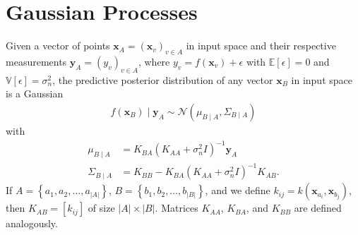 \documentclass{article}
\def\*#1{\bm{#1}}
\begin{document}
 


\begin{abstract}\end{abstract} 

\section{Gaussian Processes}
Given a vector of points $\*x_A = \left(\*x_v\right)_{v\in A}$ in input space
and their respective measurements
$\*y_A = \left(y_v\right)_{v\in A}$, where $y_v = f(\*x_v) + \epsilon$
with $\mathbb{E}[\epsilon] = 0$ and $\mathbb{V}[\epsilon] = \sigma_n^2$,
the predictive posterior distribution of any vector $\*x_B$ in input
space is a Gaussian
\begin{align*}
f(\*x_B)\mid \*y_A \sim \mathcal{N}\left(\mu_{B\mid A}, \Sigma_{B\mid A}\right)
\end{align*}
with
\begin{align*}
\mu_{B\mid A} &= K_{BA}\left(K_{AA} + \sigma_n^2 I\right)^{-1}\*y_A\\
\Sigma_{B\mid A} &= K_{BB} - K_{BA}\left(K_{AA} + \sigma_n^2 I\right)^{-1}K_{AB}.
\end{align*}
If $A = \left\{a_1, a_2, \ldots, a_{|A|}\right\}$, $B = \left\{b_1, b_2, \ldots, b_{|B|}\right\}$,
and we define $k_{ij} = k(\*x_{a_i}, \*x_{b_j})$,
then $K_{AB} = \left[k_{ij}\right]$ of size $|A|\times |B|$. Matrices $K_{AA}$, $K_{BA}$, and
$K_{BB}$ are defined analogously.
\end{document}
